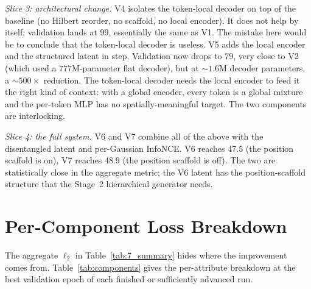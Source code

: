 \emph{Slice 3: architectural change.} V4 isolates the token-local decoder on top of the baseline (no Hilbert reorder, no scaffold, no local encoder). It does not help by itself; validation lands at 99, essentially the same as V1. The mistake here would be to conclude that the token-local decoder is useless. V5 adds the local encoder and the structured latent in step. Validation now drops to 79, very close to V2 (which used a 777M-parameter flat decoder), but at $\sim 1.6$M decoder parameters, a $\sim 500\times$ reduction. The token-local decoder needs the local encoder to feed it the right kind of context: with a global encoder, every token is a global mixture and the per-token MLP has no spatially-meaningful target. The two components are interlocking.

\emph{Slice 4: the full system.} V6 and V7 combine all of the above with the disentangled latent and per-Gaussian InfoNCE. V6 reaches 47.5 (the position scaffold is on), V7 reaches 48.9 (the position scaffold is off). The two are statistically close in the aggregate metric; the V6 latent has the position-scaffold structure that the Stage~2 hierarchical generator needs.

\section{Per-Component Loss Breakdown}
\label{sec:results_components}

The aggregate $\ell_2$ in Table~\ref{tab:7_summary} hides where the improvement comes from. Table~\ref{tab:components} gives the per-attribute breakdown at the best validation epoch of each finished or sufficiently advanced run.

